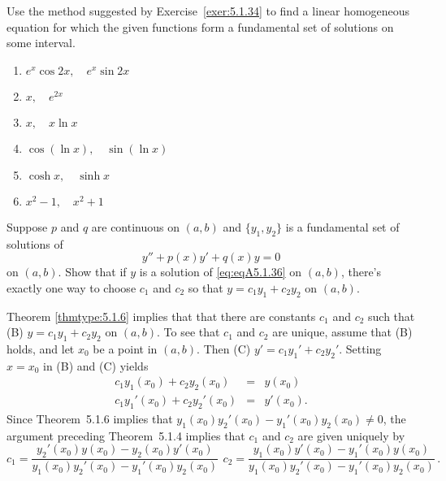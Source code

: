 \documentclass{ximera}
\begin{document}
\begin{problem}\label{exer:5.1.35}
Use the method suggested by Exercise~\ref{exer:5.1.34} to find a linear
homogeneous equation for which the given functions form a fundamental
set of solutions on some interval.


\begin{enumerate}
\item $e^x \cos 2x, \quad e^x \sin 2x$
\item $x, \quad e^{2x}$
\item $x, \quad x \ln x$
\item $\cos (\ln x), \quad \sin (\ln x)$
\item $\cosh x, \quad \sinh x$
\item $ x^2-1, \quad x^2+1$
\end{enumerate}
\end{problem}

\begin{problem}\label{exer:5.1.36}
Suppose  $p$ and $q$ are continuous  on  $(a,b)$ and
  $\{y_1,y_2\}$ is
a fundamental set of solutions of
\begin{equation}\label{eq:eqA5.1.36}
y''+p(x)y'+q(x)y=0
\end{equation}
on $(a,b)$. Show that if $y$ is a solution of \ref{eq:eqA5.1.36}
on  $(a,b)$, there's exactly one way  to choose $c_1$ and $c_2$
so that $y=c_1y_1+c_2y_2$ on  $(a,b)$.

\begin{solution}
    Theorem \ref{thmtype:5.1.6} implies that
that there are constants $c_1$ and $c_2$ such that
(B) $y=c_1y_1+c_2y_2$
on $(a,b)$. To see that $c_1$ and $c_2$ are unique, assume that (B)
holds, and let $x_0$ be a point in  $(a,b)$. Then (C)
$y'=c_1y_1'+c_2y_2'$. Setting $x=x_0$ in (B) and (C) yields
$$
\begin{array}{rcc}
c_1y_1(x_0)+c_2y_2(x_0)&=&y(x_0)\\
c_1y_1'(x_0)+c_2y_2'(x_0)&=&y'(x_0).
\end{array}
$$
Since  Theorem~5.1.6  implies that
$y_1(x_0)y_2'(x_0)-y_1'(x_0)y_2(x_0)\ne0$, the argument preceding
 Theorem~5.1.4 implies that $c_1$ and $c_2$ are given
uniquely by
$$
c_1=\frac{y_2'(x_0)y(x_0)-y_2(x_0)y'(x_0)}{
y_1(x_0)y_2'(x_0)-y_1'(x_0)y_2(x_0)}\,\
c_2=\frac{y_1(x_0)y'(x_0)-y_1'(x_0)y(x_0)}{
y_1(x_0)y_2'(x_0)-y_1'(x_0)y_2(x_0)}\,.
$$
\end{solution}
\end{problem}
\end{document}
